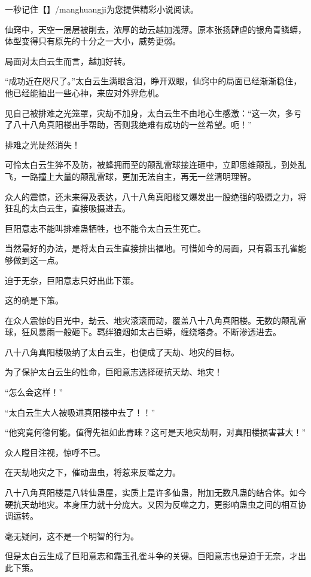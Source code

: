 
\begin{this_body}

一秒记住【】/manghuangji为您提供精彩小说阅读。

仙窍中，天空一层层被削去，浓厚的劫云越加浅薄。原本张扬肆虐的银角青鳞蟒，体型变得只有原先的十分之一大小，威势更弱。

局面对太白云生而言，越加好转。

“成功近在咫尺了。”太白云生满眼含泪，睁开双眼，仙窍中的局面已经渐渐稳住，他已经能抽出一些心神，来应对外界危机。

见自己被排难之光笼罩，灾劫不加身，太白云生不由地心生感激：“这一次，多亏了八十八角真阳楼出手帮助，否则我绝难有成功的一丝希望。呃！”

排难之光陡然消失！

可怜太白云生猝不及防，被蜂拥而至的颠乱雷球接连砸中，立即思维颠乱，到处乱飞，一路撞上大量的颠乱雷球，更加无法自主，再无一丝清明理智。

众人的震惊，还未来得及表达，八十八角真阳楼又爆发出一股绝强的吸摄之力，将狂乱的太白云生，直接吸摄进去。

巨阳意志不能叫排难蛊牺牲，也不能令太白云生死亡。

当然最好的办法，是将太白云生直接排出福地。可惜如今的局面，只有霜玉孔雀能够做到这一点。

迫于无奈，巨阳意志只好出此下策。

这的确是下策。

在众人震惊的目光中，劫云、地灾滚滚而动，覆盖八十八角真阳楼。无数的颠乱雷球，狂风暴雨一般砸下。羁绊狼烟如太古巨蟒，缠绕塔身。不断渗透进去。

八十八角真阳楼吸纳了太白云生，也便成了天劫、地灾的目标。

为了保护太白云生的性命，巨阳意志选择硬抗天劫、地灾！

“怎么会这样！”

“太白云生大人被吸进真阳楼中去了！！”

“他究竟何德何能。值得先祖如此青睐？这可是天地灾劫啊，对真阳楼损害甚大！”

众人瞠目注视，惊呼不已。

在天劫地灾之下，催动蛊虫，将惹来反噬之力。

八十八角真阳楼是八转仙蛊屋，实质上是许多仙蛊，附加无数凡蛊的结合体。如今硬抗天劫地灾。本身压力就十分庞大。又因为反噬之力，更影响蛊虫之间的相互协调运转。

毫无疑问，这不是一个明智的行为。

但是太白云生成了巨阳意志和霜玉孔雀斗争的关键。巨阳意志也是迫于无奈，才出此下策。


\end{this_body}
